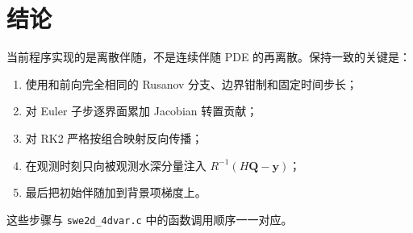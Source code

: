 \documentclass[12pt,a4paper]{article}
\begin{document}
\section{结论}

当前程序实现的是离散伴随，不是连续伴随 PDE 的再离散。保持一致的关键是：
\begin{enumerate}
\item 使用和前向完全相同的 Rusanov 分支、边界钳制和固定时间步长；
\item 对 Euler 子步逐界面累加 Jacobian 转置贡献；
\item 对 RK2 严格按组合映射反向传播；
\item 在观测时刻只向被观测水深分量注入 $R^{-1}(H\mathbf{Q}-\mathbf{y})$；
\item 最后把初始伴随加到背景项梯度上。
\end{enumerate}
这些步骤与 \texttt{swe2d\_4dvar.c} 中的函数调用顺序一一对应。
\end{document}
